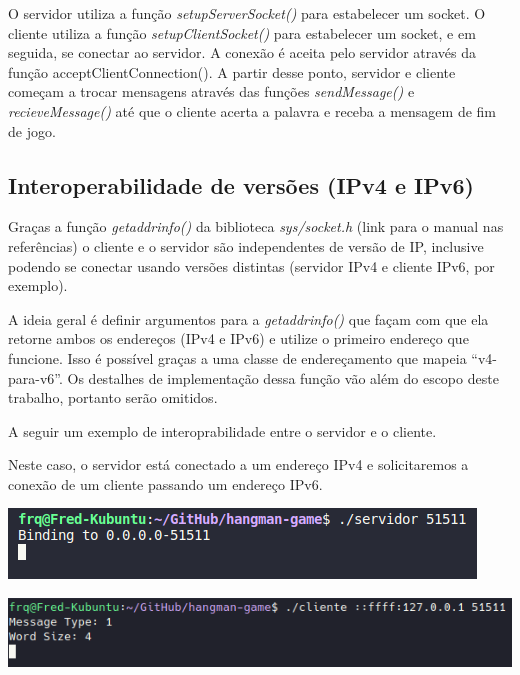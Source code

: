 \documentclass[12pt]{article}
\begin{document}
O servidor utiliza a função \emph{setupServerSocket()} para estabelecer um socket.
O cliente utiliza a função \emph{setupClientSocket()} para estabelecer um socket, e em seguida, se conectar ao servidor.
A conexão é aceita pelo servidor através da função \emph{}{acceptClientConnection()}.
A partir desse ponto, servidor e cliente começam a trocar mensagens através das funções \emph{sendMessage()} e \emph{recieveMessage()}
até que o cliente acerta a palavra e receba a mensagem de fim de jogo.

\subsection{Interoperabilidade de versões (IPv4 e IPv6)}
Graças a função \emph{getaddrinfo()} da biblioteca \emph{sys/socket.h} (link para o manual nas referências)
o cliente e o servidor são independentes de versão de IP, inclusive podendo se conectar usando versões distintas (servidor IPv4 e cliente IPv6, por exemplo). \par
A ideia geral é definir argumentos para a \emph{getaddrinfo()} que façam com que ela retorne ambos os endereços (IPv4 e IPv6) e utilize o primeiro endereço que funcione.
Isso é possível graças a uma classe de endereçamento que mapeia ``v4-para-v6''. Os destalhes de implementação dessa função vão além do escopo deste trabalho, portanto serão omitidos. \par

A seguir um exemplo de interoprabilidade entre o servidor e o cliente. \par Neste caso, o servidor está conectado a um endereço IPv4 e solicitaremos a conexão de um cliente passando um endereço IPv6.

\begin{center}
    \includegraphics{Figura3.png}
\end{center}

\begin{center}
    \includegraphics{Figura4.png}
\end{center}
\end{document}
